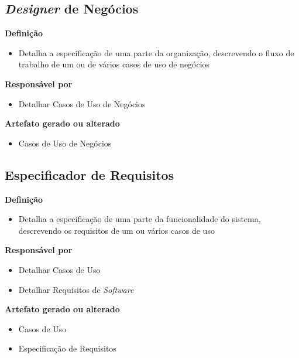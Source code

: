 \subsection{\textit{Designer} de Negócios}

\textbf{Definição}
\begin{itemize}
\item Detalha a especificação de uma parte da organização, descrevendo o fluxo de trabalho de um ou de vários casos de uso de negócios
\end{itemize}

\textbf{Responsável por}
\begin{itemize}
\item Detalhar Casos de Uso de Negócios
\end{itemize}

\textbf{Artefato gerado ou alterado}
\begin{itemize}
\item Casos de Uso de Negócios
\end{itemize}

\subsection{Especificador de Requisitos}

\textbf{Definição}
\begin{itemize}
\item Detalha a especificação de uma parte da funcionalidade do sistema, descrevendo os requisitos de um ou vários casos de uso
\end{itemize}

\textbf{Responsável por}
\begin{itemize}
\item Detalhar Casos de Uso
\item Detalhar Requisitos de \textit{Software}
\end{itemize}

\textbf{Artefato gerado ou alterado}
\begin{itemize}
\item Casos de Uso
\item Especificação de Requisitos
\end{itemize}

